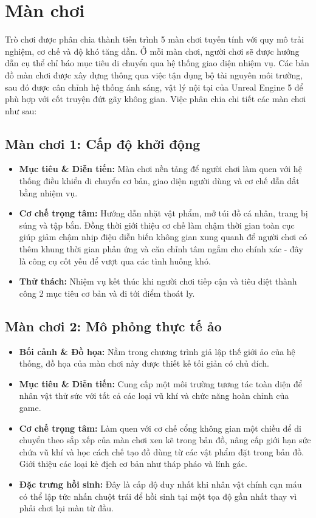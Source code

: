 \documentclass[../DoAn.tex]{subfiles}
\begin{document}
\section{Màn chơi}
Trò chơi được phân chia thành tiến trình 5 màn chơi tuyến tính với quy mô trải nghiệm, cơ chế và độ khó tăng dần. Ở mỗi màn chơi, người chơi sẽ được hướng dẫn cụ thể chỉ báo mục tiêu di chuyển qua hệ thống giao diện nhiệm vụ. Các bản đồ màn chơi được xây dựng thông qua việc tận dụng bộ tài nguyên môi trường, sau đó được cân chỉnh hệ thống ánh sáng, vật lý nội tại của Unreal Engine 5 để phù hợp với cốt truyện đứt gãy không gian. Việc phân chia chi tiết các màn chơi như sau:

\subsection{Màn chơi 1: Cấp độ khởi động}
\begin{itemize}
    \item \textbf{Mục tiêu \& Diễn tiến:} Màn chơi nền tảng để người chơi làm quen với hệ thống điều khiển di chuyển cơ bản, giao diện người dùng và cơ chế dẫn dắt bằng nhiệm vụ.
    \item \textbf{Cơ chế trọng tâm:} Hướng dẫn nhặt vật phẩm, mở túi đồ cá nhân, trang bị súng và tập bắn. Đồng thời giới thiệu cơ chế làm chậm thời gian toàn cục giúp giảm chậm nhịp điệu diễn biến không gian xung quanh để người chơi có thêm khung thời gian phản ứng và căn chỉnh tâm ngắm cho chính xác - đây là công cụ cốt yếu để vượt qua các tình huống khó.
    \item \textbf{Thử thách:} Nhiệm vụ kết thúc khi người chơi tiếp cận và tiêu diệt thành công 2 mục tiêu cơ bản và đi tới điểm thoát ly.
\end{itemize}

\subsection{Màn chơi 2: Mô phỏng thực tế ảo}
\begin{itemize}
    \item \textbf{Bối cảnh \& Đồ họa:} Nằm trong chương trình giả lập thế giới ảo của hệ thống, đồ họa của màn chơi này được thiết kế tối giản có chủ đích.
    \item \textbf{Mục tiêu \& Diễn tiến:} Cung cấp một môi trường tương tác toàn diện để nhân vật thử sức với tất cả các loại vũ khí và chức năng hoàn chỉnh của game.
    \item \textbf{Cơ chế trọng tâm:} Làm quen với cơ chế cổng không gian một chiều để di chuyển theo sắp xếp của màn chơi xen kẽ trong bản đồ, nâng cấp giới hạn sức chứa vũ khí và học cách chế tạo đồ dùng từ các vật phẩm đặt trong bản đồ. Giới thiệu các loại kẻ địch cơ bản như tháp pháo và lính gác.
    \item \textbf{Đặc trưng hồi sinh:} Đây là cấp độ duy nhất khi nhân vật chính cạn máu có thể lập tức nhấn chuột trái để hồi sinh tại một tọa độ gần nhất thay vì phải chơi lại màn từ đầu.
\end{itemize}
\end{document}
